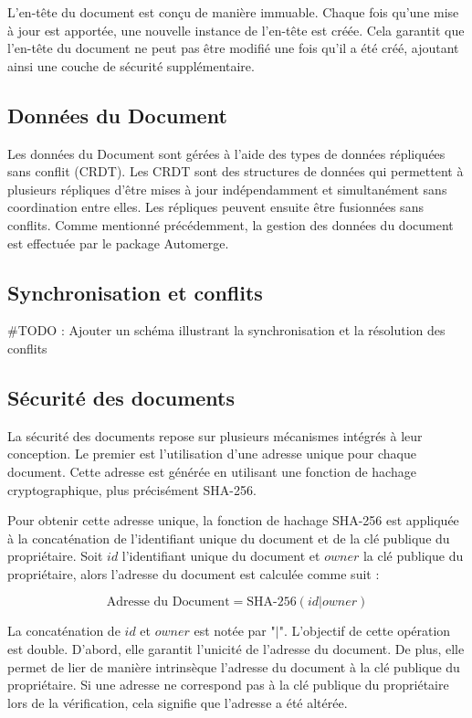 L'en-tête du document est conçu de manière immuable. Chaque fois qu'une mise à jour est apportée, une nouvelle instance de l'en-tête est créée. Cela garantit que l'en-tête du document ne peut pas être modifié une fois qu'il a été créé, ajoutant ainsi une couche de sécurité supplémentaire.

\subsection{Données du Document}

Les données du Document sont gérées à l'aide des types de données répliquées sans conflit (CRDT). Les CRDT sont des structures de données qui permettent à plusieurs répliques d'être mises à jour indépendamment et simultanément sans coordination entre elles. Les répliques peuvent ensuite être fusionnées sans conflits.
Comme mentionné précédemment, la gestion des données du document est effectuée par le package Automerge.

\subsection{Synchronisation et conflits}

#TODO : Ajouter un schéma illustrant la synchronisation et la résolution des conflits

\subsection{Sécurité des documents}

La sécurité des documents repose sur plusieurs mécanismes intégrés à leur conception. Le premier est l'utilisation d'une adresse unique pour chaque document. Cette adresse est générée en utilisant une fonction de hachage cryptographique, plus précisément SHA-256.

Pour obtenir cette adresse unique, la fonction de hachage SHA-256 est appliquée à la concaténation de l'identifiant unique du document et de la clé publique du propriétaire. Soit $id$ l'identifiant unique du document et $owner$ la clé publique du propriétaire, alors l'adresse du document est calculée comme suit :

\begin{equation}
  \text{Adresse du Document} = \text{SHA-256}(id | owner)
\end{equation}

La concaténation de $id$ et $owner$ est notée par "$|$". L'objectif de cette opération est double. D'abord, elle garantit l'unicité de l'adresse du document. De plus, elle permet de lier de manière intrinsèque l'adresse du document à la clé publique du propriétaire. Si une adresse ne correspond pas à la clé publique du propriétaire lors de la vérification, cela signifie que l'adresse a été altérée.


